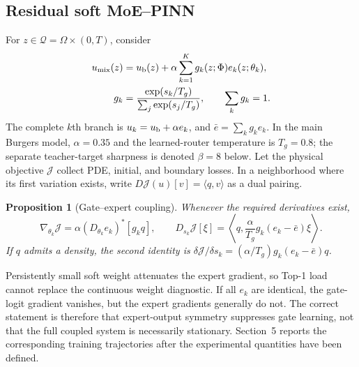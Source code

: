 \documentclass[preprint,12pt]{elsarticle}
\newtheorem{proposition}{Proposition}
\theoremstyle{remark}
\begin{document}
\subsection{Residual soft MoE--PINN}
For $z\in\mathcal Q=\Omega\times(0,T)$, consider
\begin{equation}
\begin{aligned}
u_{\rm mix}(z)&=u_{\rm b}(z)+\alpha\sum_{k=1}^{K}g_k(z;\Phi)e_k(z;\theta_k),\\
g_k&=\frac{\exp(s_k/T_g)}{\sum_j\exp(s_j/T_g)},\qquad \sum_k g_k=1 .
\end{aligned}
\label{eq:model}
\end{equation}
The complete $k$th branch is $u_k=u_{\rm b}+\alpha e_k$, and $\bar e=\sum_k g_ke_k$. In the main Burgers model, $\alpha=0.35$ and the learned-router temperature is $T_g=0.8$; the separate teacher-target sharpness is denoted $\beta=8$ below. Let the physical objective $\mathcal J$ collect PDE, initial, and boundary losses. In a neighborhood where its first variation exists, write $D\mathcal J(u)[v]=\langle q,v\rangle$ as a dual pairing.

\begin{proposition}[Gate--expert coupling]
Whenever the required derivatives exist,
\begin{equation}
\nabla_{\theta_k}\mathcal J=\alpha(D_{\theta_k}e_k)^*[g_kq],\qquad
D_{s_k}\mathcal J[\xi]=\left\langle q,\frac{\alpha}{T_g}g_k(e_k-\bar e)\xi\right\rangle .
\label{eq:coupling}
\end{equation}
If $q$ admits a density, the second identity is $\delta\mathcal J/\delta s_k=(\alpha/T_g)g_k(e_k-\bar e)q$.
\end{proposition}
Persistently small soft weight attenuates the expert gradient\cite{chi2022collapse}, so Top-1 load cannot replace the continuous weight diagnostic. If all $e_k$ are identical, the gate-logit gradient vanishes, but the expert gradients generally do not. The correct statement is therefore that expert-output symmetry suppresses gate learning, not that the full coupled system is necessarily stationary. Section~5 reports the corresponding training trajectories after the experimental quantities have been defined.
\end{document}
